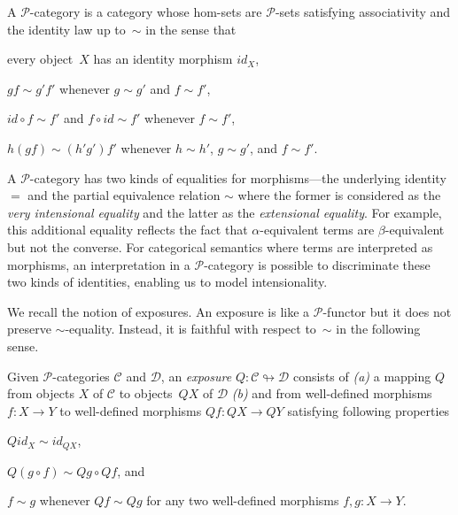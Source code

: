 \documentclass[a4paper,UKenglish,numberwithinsect,cleveref,thm-restate]{lipics-v2021}
\numberwithin{equation}{section}
\newcommand{\PP}{\mathscr{P}}
\newcommand{\iid}{\mathit{id}}
\theoremstyle{plain}
\begin{document}
\begin{definition}
  A $\PP$-category is a category whose hom-sets are $\PP$-sets satisfying associativity and the identity law up to~$\sim$ in the sense that 
  \begin{romanenumerate}
  \item every object~$X$ has an identity morphism $\iid_X$, 
  \item $g f \sim g' f'$ whenever $g\sim g'$ and $f \sim f'$,
  \item $\iid \circ f \sim f'$ and $f \circ \iid \sim f'$ whenever $f \sim f'$,
  \item $h(gf) \sim (h'g')f'$ whenever $h\sim h'$, $g \sim g'$, and $f \sim f'$.
  \end{romanenumerate}
\end{definition}

A $\PP$-category has two kinds of equalities for morphisms---the underlying identity $=$ and the partial equivalence relation $\sim$ where the former is considered as the \emph{very intensional equality} and the latter as the \emph{extensional equality}. 
For example, this additional equality reflects the fact that $\alpha$-equivalent terms are $\beta$-equivalent but not the converse.
For categorical semantics where terms are interpreted as morphisms, an interpretation in a $\PP$-category is possible to discriminate these two kinds of identities, enabling us to model intensionality.

We recall the notion of exposures.
An exposure is like a $\PP$-functor but it does not preserve $\sim$-equality.
Instead, it is faithful with respect to~$\sim$ in the following sense.
\begin{definition}
  Given $\PP$-categories $\mathscr{C}$ and $\mathscr{D}$, an \emph{exposure} $Q\colon \mathscr{C} \looparrowright \mathscr{D}$ consists of \emph{(a)} a mapping $Q$ from objects $X$ of $\mathscr{C}$ to objects~$QX$ of $\mathscr{D}$ \emph{(b)} and from well-defined morphisms $f\colon X \to Y$ to well-defined morphisms $Qf\colon QX \to QY$ satisfying following properties
  \begin{romanenumerate}
    \item $Q\iid_X \sim \iid_{QX}$,
    \item $Q(g \circ f) \sim Qg \circ Qf$, and
    \item $f \sim g$ whenever $Qf \sim Qg$ for any two well-defined morphisms $f, g\colon X \to Y$. 
  \end{romanenumerate}
\end{definition}
\end{document}
